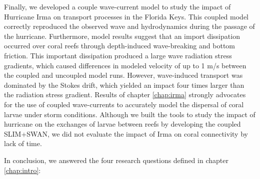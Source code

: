Finally, we developed a couple wave-current model to study the impact of Hurricane Irma on transport processes in the Florida Keys. This coupled model correctly reproduced the observed wave and hydrodynamics during the passage of the hurricane. Furthermore, model results suggest that an import dissipation occurred over coral reefs through depth-induced wave-breaking and bottom friction. This important dissipation produced a large wave radiation stress gradients, which caused differences in modeled velocity of up to 1 m/s between the coupled and uncoupled model runs. However, wave-induced transport was dominated by the Stokes drift, which yielded an impact four times larger than the radiation stress gradient. Results of chapter \ref{chap:irma} strongly advocates for the use of coupled wave-currents to accurately model the dispersal of coral larvae under storm conditions. Although we built the tools to study the impact of hurricane on the exchanges of larvae between reefs by developing the coupled SLIM+SWAN, we did not evaluate the impact of Irma on coral connectivity by lack of time.

In conclusion, we answered the four research questions defined in chapter \ref{chap:intro}:

